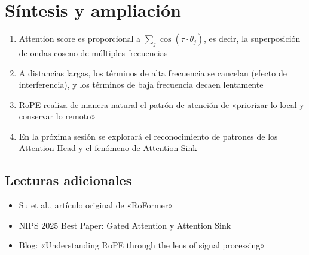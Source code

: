\section{Síntesis y ampliación}

\begin{enumerate}
  \item Attention score es proporcional a $\sum_j \cos(\tau \cdot \theta_j)$, es decir, la superposición de ondas coseno de múltiples frecuencias
  \item A distancias largas, los términos de alta frecuencia se cancelan (efecto de interferencia), y los términos de baja frecuencia decaen lentamente
  \item RoPE realiza de manera natural el patrón de atención de «priorizar lo local y conservar lo remoto»
  \item En la próxima sesión se explorará el reconocimiento de patrones de los Attention Head y el fenómeno de Attention Sink
\end{enumerate}

\subsection{Lecturas adicionales}
\begin{itemize}
  \item Su et al., artículo original de «RoFormer»
  \item NIPS 2025 Best Paper: Gated Attention y Attention Sink
  \item Blog: «Understanding RoPE through the lens of signal processing»
\end{itemize}


